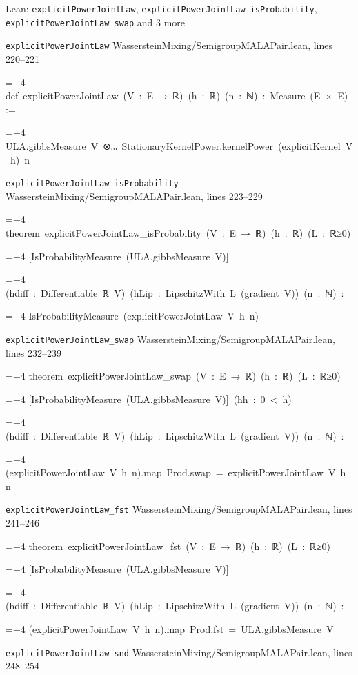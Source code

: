 \documentclass[11pt,a4paper]{article}
\newlength{\leancharwidth}
\newenvironment{leancode}{\par\smallskip\begingroup\ttfamily\footnotesize\raggedright
  \settowidth{\leancharwidth}{M}\setlength{\parskip}{0pt}\setlength{\parindent}{0pt}
  \frenchspacing}{\par\endgroup\smallskip}
\newcommand{\leanline}[2]{\hangindent=\dimexpr#1\leancharwidth+4\leancharwidth\relax
  \hangafter=1\noindent\hspace*{#1\leancharwidth}#2\par}
\newcommand{\leansource}[1]{\par{\footnotesize\color{leanmuted}#1}\par}
\begin{document}
\begin{leanbox}{Lean: \texttt{explicitPowerJointLaw}, \texttt{explicitPowerJointLaw\_\allowbreak{}isProbability}, \texttt{explicitPowerJointLaw\_\allowbreak{}swap} and 3 more}
\leansource{\texttt{explicitPowerJointLaw} \quad WassersteinMixing/\allowbreak{}SemigroupMALAPair.lean, lines 220–221}
\begin{leancode}
\leanline{0}{def\ explicitPowerJointLaw\ (V\ :\ E\ →\ ℝ)\ (h\ :\ ℝ)\ (n\ :\ ℕ)\ :\ Measure\ (E\ ×\ E)\ :=}
\leanline{2}{ULA.gibbsMeasure\ V\ ⊗ₘ\ StationaryKernelPower.kernelPower\ (explicitKernel\ V\ h)\ n}
\end{leancode}
\leansource{\texttt{explicitPowerJointLaw\_\allowbreak{}isProbability} \quad WassersteinMixing/\allowbreak{}SemigroupMALAPair.lean, lines 223–229}
\begin{leancode}
\leanline{0}{theorem\ explicitPowerJointLaw\_isProbability\ (V\ :\ E\ →\ ℝ)\ (h\ :\ ℝ)\ (L\ :\ ℝ≥0)}
\leanline{4}{[IsProbabilityMeasure\ (ULA.gibbsMeasure\ V)]}
\leanline{4}{(hdiff\ :\ Differentiable\ ℝ\ V)\ (hLip\ :\ LipschitzWith\ L\ (gradient\ V))\ (n\ :\ ℕ)\ :}
\leanline{4}{IsProbabilityMeasure\ (explicitPowerJointLaw\ V\ h\ n)}
\end{leancode}
\leansource{\texttt{explicitPowerJointLaw\_\allowbreak{}swap} \quad WassersteinMixing/\allowbreak{}SemigroupMALAPair.lean, lines 232–239}
\begin{leancode}
\leanline{0}{theorem\ explicitPowerJointLaw\_swap\ (V\ :\ E\ →\ ℝ)\ (h\ :\ ℝ)\ (L\ :\ ℝ≥0)}
\leanline{4}{[IsProbabilityMeasure\ (ULA.gibbsMeasure\ V)]\ (hh\ :\ 0\ <\ h)}
\leanline{4}{(hdiff\ :\ Differentiable\ ℝ\ V)\ (hLip\ :\ LipschitzWith\ L\ (gradient\ V))\ (n\ :\ ℕ)\ :}
\leanline{4}{(explicitPowerJointLaw\ V\ h\ n).map\ Prod.swap\ =\ explicitPowerJointLaw\ V\ h\ n}
\end{leancode}
\leansource{\texttt{explicitPowerJointLaw\_\allowbreak{}fst} \quad WassersteinMixing/\allowbreak{}SemigroupMALAPair.lean, lines 241–246}
\begin{leancode}
\leanline{0}{theorem\ explicitPowerJointLaw\_fst\ (V\ :\ E\ →\ ℝ)\ (h\ :\ ℝ)\ (L\ :\ ℝ≥0)}
\leanline{4}{[IsProbabilityMeasure\ (ULA.gibbsMeasure\ V)]}
\leanline{4}{(hdiff\ :\ Differentiable\ ℝ\ V)\ (hLip\ :\ LipschitzWith\ L\ (gradient\ V))\ (n\ :\ ℕ)\ :}
\leanline{4}{(explicitPowerJointLaw\ V\ h\ n).map\ Prod.fst\ =\ ULA.gibbsMeasure\ V}
\end{leancode}
\leansource{\texttt{explicitPowerJointLaw\_\allowbreak{}snd} \quad WassersteinMixing/\allowbreak{}SemigroupMALAPair.lean, lines 248–254}
\begin{leancode}

\end{leancode}
\end{leanbox}
\end{document}
